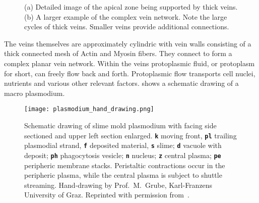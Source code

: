 		
		\begin{figure}[!htbp]
			\centering
			\qquad
			\caption[Details of apical zone and supporting network]{(a) Detailed image of the apical zone being supported by thick veins. (b) A larger example of the complex vein network. Note the large cycles of thick veins. Smaller veins provide additional connections.}
			\label{fig:plasmodium_details}
		\end{figure}

		
	
		The veins themselves are approximately cylindric with vein walls consisting of a thick connected mesh of Actin and Myosin fibers. They connect to form a complex planar vein network. Within the veins protoplasmic fluid, or protoplasm for short, can freely flow back and forth. Protoplasmic flow transports cell nuclei, nutrients and various other relevant factors.  shows a schematic drawing of a macro plasmodium.

		\begin{figure}[!htb]
			\centering
			\texttt{[image: plasmodium\_hand\_drawing.png]}
			\caption[Schematic drawing of the plasmodium of \P]{Schematic drawing of slime mold plasmodium with facing side sectioned and upper left section enlarged. \textbf{\texttt{k}} moving front, \textbf{\texttt{pl}} trailing plasmodial strand, \textbf{\texttt{f}} deposited material, \textbf{\texttt{s}} slime; \textbf{\texttt{d}} vacuole with deposit; \textbf{\texttt{ph}} phagocytosis vesicle; \textbf{\texttt{n}} nucleus; \textbf{\texttt{z}} central plasma; \textbf{\texttt{pe}} peripheric membrane stacks. Peristaltic contractions occur in the peripheric plasma, while the central plasma is subject to shuttle streaming. Hand-drawing by Prof.~M.~Grube, Karl-Franzens University of Graz. Reprinted with permission from~\cite{grube2016physarum}.}
			\label{fig:plasmodium_hand_drawing}
		\end{figure}

